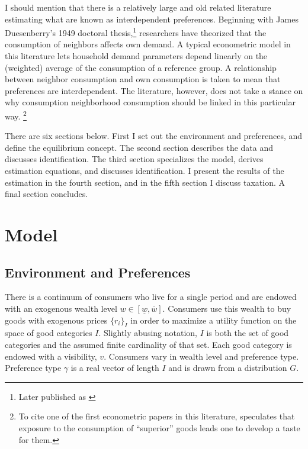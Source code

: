 \documentclass[12pt]{article}
\begin{document}
I should mention that there is a relatively large and old related literature estimating what are known as interdependent preferences.  Beginning with James Duesenberry's 1949 doctoral thesis,\footnote{Later published as \citep{Duesenberry1949}} researchers have theorized that the consumption of neighbors affects own demand.  A typical econometric model in this literature lets household demand parameters depend linearly on the (weighted) average of the consumption of a reference group. A relationship between neighbor consumption and own consumption is taken to mean that preferences are interdependent.  The literature, however, does not take a stance on why consumption neighborhood consumption should be linked in this particular way. \footnote{To cite one of the first econometric papers in this literature, \citet{Pollak1976} speculates that exposure to the consumption of ``superior'' goods leads one to develop a taste for them.}  

There are six sections below.  First I set out the environment and preferences, and define the equilibrium concept.  The second section describes the data and discusses identification.  The third section specializes the model, derives estimation equations, and discusses identification.  I present the results of the estimation in the fourth section, and in the fifth section I discuss taxation.  A final section concludes. 

\section{Model}
\subsection{Environment and Preferences}
There is a continuum of consumers who live for a single period and are endowed with an exogenous wealth level $w \in \left[ \underline{w},\overline{w} \right]$.
Consumers use this wealth to buy goods with exogenous prices $\{r_i\}_I$ in order to maximize a utility function on the space of good categories $I$. 
Slightly abusing notation, $I$ is both the set of good categories and the assumed finite cardinality of that set.
Each good category is endowed with a visibility, $v$.
Consumers vary in wealth level and preference type.
Preference type $\gamma$ is a real vector of length $I$ and is  drawn from a distribution $G$.
\end{document}
